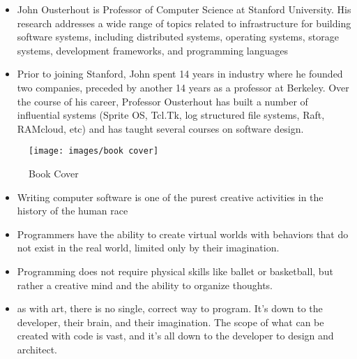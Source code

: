 %
%
%
%




{ 
	
\begin{itemize}
    \item John Ousterhout is Professor of Computer Science at Stanford University. His research addresses a wide range of topics related to infrastructure for building software systems, including distributed systems, operating systems, storage systems, development frameworks, and programming languages
    
   \item Prior to joining Stanford, John spent 14 years in industry where he founded two companies, preceded by another 14 years as a professor at Berkeley. Over the course of his career, Professor Ousterhout has built a number of influential systems (Sprite OS, Tcl.Tk, log structured file systems, Raft, RAMcloud, etc) and has taught several courses on software design.
    
  \end{itemize}


{
\begin{figure}[ht]
	\centering
	\texttt{[image: images/book cover]}
	\caption{Book Cover}
\end{figure}

}







}


{ 


  \begin{itemize}
    \item	Writing computer software is one of the purest creative activities in the history of the human race
    
      \item	Programmers have the ability to create virtual worlds with behaviors that do not exist in the real world, limited only by their imagination.
    
      \item	Programming does not require physical skills like ballet or basketball, but rather a creative mind and the ability to organize thoughts.
    
      \item	as with art, there is no single, correct way to program. It’s down to the developer, their brain, and their imagination. The scope of what can be created with code is vast, and it’s all down to the developer to design and architect.
    
    
          
         
  \end{itemize}


}

